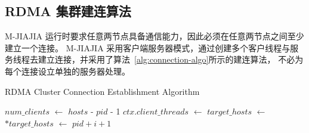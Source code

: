 {    %



    \subsection{RDMA 集群建连算法}

    M-JIAJIA 运行时要求任意两节点具备通信能力，因此必须在任意两节点之间至少建立一个连接。
    M-JIAJIA 采用客户端服务器模式，通过创建多个客户线程与服务线程去建立连接，并采用了算法~\ref{alg:connection-algo}所示的建连算法，
    不必为每个连接设立单独的服务器处理。

    \begin{algorithm}
        \caption{RDMA Cluster Connection Establishment Algorithm}\label{alg:connection-algo}
        \begin{algorithmic}[1]
            \State {}
            \EndIf
            \State $num\_clients$ $\gets$ $hosts$ - $pid$ - 1
            \State $ctx.client\_threads$ $\gets$ 
            \State $target\_hosts$ $\gets$ 
            \State $*target\_hosts$ $\gets$ $pid + i + 1$
            \State {}
            \EndFor
            \EndIf
            \State {}
            \EndIf


\end{algorithmic}
\end{algorithm}}
